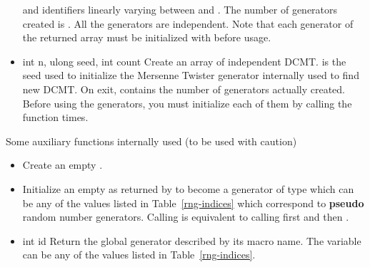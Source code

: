 \begin{itemize}
  and identifiers linearly varying between  and . The
  number of generators created is . All the
  generators are independent. Note that each generator of the returned array
  must be initialized with  before usage.
\item {}
  {int n, ulong seed, int \ptr count}
  \sshortdescribe Create an array of  independent DCMT.  is
  the seed used to initialize the Mersenne Twister generator internally used to
  find new DCMT. On exit,  contains the number of generators actually
  created. Before using the generators, you must initialize each of them by calling the
  function   times.
\end{itemize}

Some auxiliary functions internally used (to be used with caution)
\begin{itemize}
\item {}
  \sshortdescribe Create an empty \PnlRng.
\item {}
  \sshortdescribe Initialize an empty \PnlRng as returned by
   to become a generator of type  which can be
  any of the values  listed in Table~\ref{rng-indices} which
  correspond to {\bf pseudo} random number generators.
  Calling  is equivalent to calling first
   and then . 
\item {} {int id}
  \sshortdescribe Return the global generator described by its macro name.
  The variable  can be any of the values  listed in
  Table~\ref{rng-indices}.
\end{itemize}


